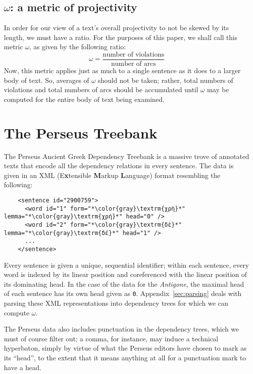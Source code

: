 \documentclass{article}
\newcommand{\FN}{\mathsf}
\begin{document}
\subsection{\ensuremath{\FN{\omega}}: a metric of projectivity}

In order for our view of a text's overall projectivity to not be skewed by its
length, we must have a ratio. For the purposes of this paper, we shall call this
metric $\omega$, as given by the following ratio:
%
\[ \omega = \frac{\text{number of violations}}{\text{number of arcs}} \]
%
Now, this metric applies just as much to a single sentence as it does to a
larger body of text. So, averages of \ensuremath{\FN{\omega}} should not be taken; rather, total
numbers of violations and total numbers of arcs should be accumulated until
\ensuremath{\FN{\omega}} may be computed for the entire body of text being examined.

\section{The Perseus Treebank}
%
The Perseus Ancient Greek Dependency Treebank is a massive trove of annotated
texts that encode all the dependency relations in every sentence. The data is
given in an XML (E\textbf{x}tensible \textbf{M}arkup \textbf{L}anguage) format
resembling the following:

\lstset{
  language=XML,
  escapeinside=**
}

\begin{lstlisting}
    <sentence id="2900759">
      <word id="1" form="*\color{gray}\textrm{χρὴ}*" lemma="*\color{gray}\textrm{χρή}*" head="0" />
      <word id="2" form="*\color{gray}\textrm{δὲ}*" lemma="*\color{gray}\textrm{δέ}*" head="1" />
      ...
    </sentence>
\end{lstlisting}

\noindent
%
Every sentence is given a unique, sequential identifier; within each sentence,
every word is indexed by its linear position and coreferenced with the linear
position of its dominating head. In the case of the data for the \emph{Antigone},
the maximal head of each sentence has its own head given as \lstinline{0}.
Appendix~\ref{sec:parsing} deals with parsing these XML representations into
dependency trees for which we can compute \ensuremath{\FN{\omega}}.

The Perseus data also includes punctuation in the dependency trees, which we
must of course filter out; a comma, for instance, may induce a technical
hyperbaton, simply by virtue of what the Perseus editors have chosen to mark as
its ``head'', to the extent that it means anything at all for a punctuation mark
to have a head.
\end{document}
